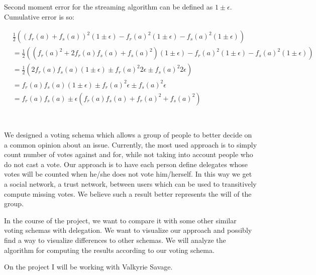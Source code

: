\documentclass[a4paper,11pt,oneside,onecolumn]{article}
\begin{document}
Second moment error for the streaming algorithm can be defined as $1 \pm \epsilon$. Cumulative error is so:

\begin{align*}
& \frac{1}{2} \left( (f_r(a) + f_s(a))^2 (1 \pm \epsilon) - f_r(a)^2 (1 \pm \epsilon) - f_s(a)^2 (1 \pm \epsilon) \right) \\
& = \frac{1}{2} \left( \left( f_r(a)^2 + 2 f_r(a) f_s(a) + f_s(a)^2 \right) (1 \pm \epsilon) - f_r(a)^2 (1 \pm \epsilon) - f_s(a)^2 (1 \pm \epsilon) \right) \\
& = \frac{1}{2} \left( 2 f_r(a) f_s(a) (1 \pm \epsilon) \pm f_r(a)^2 2 \epsilon \pm f_s(a)^2 2 \epsilon \right) \\
& = f_r(a) f_s(a) (1 \pm \epsilon) \pm f_r(a)^2 \epsilon \pm f_s(a)^2 \epsilon \\
& = f_r(a) f_s(a) \pm \epsilon ( f_r(a) f_s(a) + f_r(a)^2 + f_s(a)^2 ) \\
\end{align*}

\section{}

We designed a voting schema which allows a group of people to better decide on a common opinion about an issue. Currently,
the most used approach is to simply count number of votes against and for, while not taking into account people who do
not cast a vote. Our approach is to have each person define delegates whose votes will be counted when he/she does not
vote him/herself. In this way we get a social network, a trust network, between users which can be
used to transitively compute missing votes. We believe such a result better represents the will of the group.

In the course of the project, we want to compare it with some other similar voting schemas with delegation. We want to visualize
our approach and possibly find a way to visualize differences to other schemas. We will analyze the algorithm for computing the
results according to our voting schema.

On the project I will be working with Valkyrie Savage.
\end{document}
